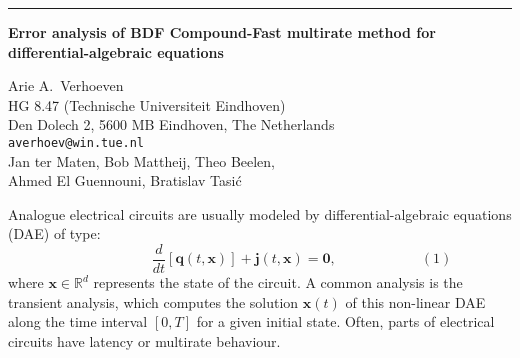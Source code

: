 \documentclass[twosided]{report}
\newcommand{\Reals}{\mathbb{R}}
\begin{document}
	\begin{center} \rule{6in}{1pt} \end{center}

\begin{center}
{\large			%
{\bf Error analysis of BDF Compound-Fast multirate method for \\
	differential-algebraic equations}}

	Arie A.~Verhoeven \\
	HG 8.47 (Technische Universiteit Eindhoven) \\
	Den Dolech 2, 5600 MB Eindhoven, The Netherlands \\
	{\tt averhoev@win.tue.nl} \\
	Jan ter Maten, Bob Mattheij, Theo Beelen, \\
	Ahmed El Guennouni, Bratislav Tasi\'c
\end{center}
Analogue electrical circuits are usually modeled by
differential-algebraic equations (DAE) of type:
$$
\qquad \qquad \qquad
\frac{d}{dt}\left[
\mathbf{q}(t,\mathbf{x})\right]+
\mathbf{j}(t,\mathbf{x})=\mathbf{0},
\qquad \qquad \qquad (1)
$$
where $\mathbf{x} \in \Reals^d$ represents the state of
the circuit. A common analysis is the transient analysis,
which computes the solution $\mathbf{x}(t)$ of this
non-linear DAE along the time interval $[0,T]$ for a given
initial state. Often, parts of electrical circuits have
latency or multirate behaviour.
\end{document}
